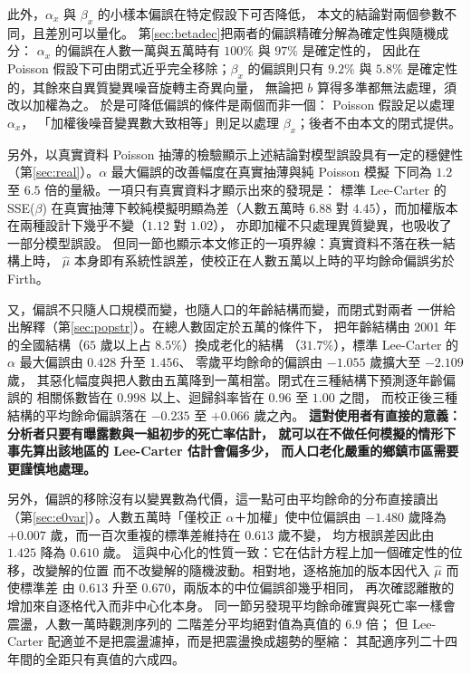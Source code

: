 \documentclass[UTF8, fontset=macnew, a4paper, 12pt]{ctexart}
\begin{document}
此外，$\alpha_x$ 與 $\beta_x$ 的小樣本偏誤在特定假設下可否降低，
本文的結論對兩個參數不同，且差別可以量化。
第\ref{sec:betadec}把兩者的偏誤精確分解為確定性與隨機成分：
$\alpha_x$ 的偏誤在人數一萬與五萬時有 $100\%$ 與 $97\%$ 是確定性的，
因此在 Poisson 假設下可由閉式近乎完全移除；$\beta_x$ 的偏誤則只有
$9.2\%$ 與 $5.8\%$ 是確定性的，其餘來自異質變異噪音旋轉主奇異向量，
無論把 $b$ 算得多準都無法處理，須改以加權為之。
於是可降低偏誤的條件是兩個而非一個： Poisson 假設足以處理 $\alpha_x$，
「加權後噪音變異數大致相等」則足以處理 $\beta_x$；後者不由本文的閉式提供。

另外，以真實資料 Poisson 抽薄的檢驗顯示上述結論對模型誤設具有一定的穩健性
（第\ref{sec:real}）。$\alpha$ 最大偏誤的改善幅度在真實抽薄與純 Poisson 模擬
下同為 $1.2$ 至 $6.5$ 倍的量級。一項只有真實資料才顯示出來的發現是：
標準 Lee-Carter 的 SSE($\beta$) 在真實抽薄下較純模擬明顯為差（人數五萬時 $6.88$
對 $4.45$），而加權版本在兩種設計下幾乎不變（$1.12$ 對 $1.02$），
亦即加權不只處理異質變異，也吸收了一部分模型誤設。
但同一節也顯示本文修正的一項界線：真實資料不落在秩一結構上時，
$\hat\mu$ 本身即有系統性誤差，使校正在人數五萬以上時的平均餘命偏誤劣於
Firth。

又，偏誤不只隨人口規模而變，也隨人口的年齡結構而變，而閉式對兩者
一併給出解釋（第\ref{sec:popstr}）。在總人數固定於五萬的條件下，
把年齡結構由 2001 年的全國結構（$65$ 歲以上占 $8.5\%$）換成老化的結構
（$31.7\%$），標準 Lee-Carter 的 $\alpha$ 最大偏誤由 $0.428$ 升至 $1.456$、
零歲平均餘命的偏誤由 $-1.055$ 歲擴大至 $-2.109$ 歲，
其惡化幅度與把人數由五萬降到一萬相當。閉式在三種結構下預測逐年齡偏誤的
相關係數皆在 $0.998$ 以上、迴歸斜率皆在 $0.96$ 至 $1.00$ 之間，
而校正後三種結構的平均餘命偏誤落在 $-0.235$ 至 $+0.066$ 歲之內。
\textbf{這對使用者有直接的意義：分析者只要有曝露數與一組初步的死亡率估計，
就可以在不做任何模擬的情形下事先算出該地區的 Lee-Carter 估計會偏多少，
而人口老化嚴重的鄉鎮市區需要更謹慎地處理。}

另外，偏誤的移除沒有以變異數為代價，這一點可由平均餘命的分布直接讀出
（第\ref{sec:e0var}）。人數五萬時「僅校正 $\alpha$＋加權」使中位偏誤由
$-1.480$ 歲降為 $+0.007$ 歲，而一百次重複的標準差維持在 $0.613$ 歲不變，
均方根誤差因此由 $1.425$ 降為 $0.610$ 歲。
這與中心化的性質一致：它在估計方程上加一個確定性的位移，改變解的位置
而不改變解的隨機波動。相對地，逐格施加的版本因代入 $\hat\mu$ 而使標準差
由 $0.613$ 升至 $0.670$，兩版本的中位偏誤卻幾乎相同，
再次確認離散的增加來自逐格代入而非中心化本身。
同一節另發現平均餘命確實與死亡率一樣會震盪，人數一萬時觀測序列的
二階差分平均絕對值為真值的 $6.9$ 倍；
但 Lee-Carter 配適並不是把震盪濾掉，而是把震盪換成趨勢的壓縮：
其配適序列二十四年間的全距只有真值的六成四。
\end{document}
